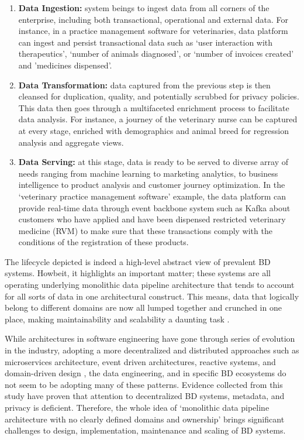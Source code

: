 \documentclass[review]{elsarticle}
\begin{document}
\begin{enumerate}
    \item \textbf{Data Ingestion:} system beings to ingest data from all corners of the enterprise, including both transactional, operational and external data. For instance, in a practice management software for veterinaries, data platform can ingest and persist transactional data such as `user interaction with therapeutics', `number of animals diagnosed', or `number of invoices created' and 'medicines dispensed'.
    \item \textbf{Data Transformation:} data captured from the previous step is then cleansed for duplication, quality, and potentially scrubbed for privacy policies. This data then goes through a multifaceted enrichment process to facilitate data analysis. For instance, a journey of the veterinary nurse can be captured at every stage, enriched with demographics and animal breed for regression analysis and aggregate views.
    \item \textbf{Data Serving:} at this stage, data is ready to be served to diverse array of needs ranging from machine learning to marketing analytics, to business intelligence to product analysis and customer journey optimization. In the `veterinary practice management software' example, the data platform can provide real-time data through event backbone system such as Kafka about customers who have applied and have been dispensed restricted veterinary medicine (RVM) to make sure that these transactions comply with the conditions of the registration of these products.
\end{enumerate}

The lifecycle depicted is indeed a high-level abstract view of prevalent BD systems. Howbeit, it highlights an important matter; these systems are all operating underlying monolithic data pipeline architecture that tends to account for all sorts of data in one architectural construct. This means, data that logically belong to different domains are now all lumped together and crunched in one place, making maintainability and scalability a daunting task \cite{monolithToMesh}.

While architectures in software engineering have gone through series of evolution in the industry, adopting a more decentralized and distributed approaches such as microservices architecture, event driven architectures, reactive systems, and domain-driven design \cite{alshuqayran2016systematic}, the data engineering, and in specific BD ecosystems do not seem to be adopting many of these patterns. Evidence collected from this study have proven that attention to decentralized BD systems, metadata, and privacy is deficient. Therefore, the whole idea of `monolithic data pipeline architecture with no clearly defined domains and ownership' brings significant challenges to design, implementation, maintenance and scaling of BD systems. 
\end{document}
